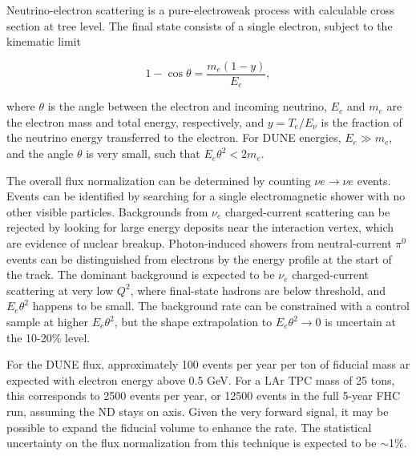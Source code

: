Neutrino-electron scattering is a pure-electroweak process with calculable cross section at tree level. The final state consists of a single electron, subject to the kinematic limit 

\begin{equation}
1 - \cos \theta = \frac{m_{e}(1-y)}{E_{e}},
\end{equation}

where $\theta$ is the angle between the electron and incoming neutrino, $E_{e}$ and $m_{e}$ are the electron mass and total energy, respectively, and $y = T_{e}/E_{\nu}$ is the fraction of the neutrino energy transferred to the electron. For DUNE energies, $E_{e} \gg m_{e}$, and the angle $\theta$ is very small, such that $E_{e}\theta^{2} < 2m_{e}$.

The overall flux normalization can be determined by counting $\nu e \rightarrow \nu e$ events. Events can be identified by searching for a single electromagnetic shower with no other visible particles. Backgrounds from $\nu_{e}$ charged-current scattering can be rejected by looking for large energy deposits near the interaction vertex, which are evidence of nuclear breakup. Photon-induced showers from neutral-current $\pi^{0}$ events can be distinguished from electrons by the energy profile at the start of the track. The dominant background is expected to be $\nu_{e}$ charged-current scattering at very low $Q^{2}$, where final-state hadrons are below threshold, and $E_{e}\theta^{2}$ happens to be small. The background rate can be constrained with a control sample at higher $E_{e}\theta^{2}$, but the shape extrapolation to $E_{e}\theta^{2} \rightarrow 0$ is uncertain at the 10-20\% level.

For the DUNE flux, approximately 100 events per year per ton of fiducial mass ar expected with electron energy above 0.5 GeV. For a LAr TPC mass of 25 tons, this corresponds to 2500 events per year, or 12500 events in the full 5-year FHC run, assuming the ND stays on axis. Given the very forward signal, it may be possible to expand the fiducial volume to enhance the rate. The statistical uncertainty on the flux normalization from this technique is expected to be $\sim$1\%.




